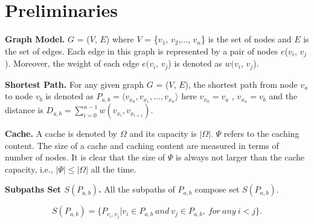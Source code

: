 \section{Preliminaries}
\label{sec:pre}
\begin{definition}
\label{def:Graph model}
{\textbf{Graph Model.}}  $G$ = ($V$, $E$) where $V$ = \{$v_1$, $v_2$,..., $v_n$\} is the set of nodes and $E$ is the set of edges. Each edge in this graph is represented by a pair of nodes $e$($v_i$, $v_j$). Moreover, the weight of each edge $e(v_i$, $v_j$) is denoted as $w(v_i$, $v_j$).
\end{definition}

\begin{definition}
\label{def:Queries and Answers}
{\textbf{Shortest Path.}} For any given graph $G$ = ($V$, $E$), the shortest path from node $v_a$ to node $v_b$ is denoted as $P_{a,b}=\langle v_{x_0},v_{x_1},...,v_{x_n}\rangle$ here $v_{x_0}=v_a$ , $v_{x_n}=v_b$ and the distance is $D_{a,b}=\sum_{i=0}^{n-1}w(v_{x_i},v_{x_{i+1}})$.
\end{definition}


\begin{definition}
\label{def:Cache}
{\textbf{Cache.}} A cache is denoted by $\Omega$ and its capacity is $|\Omega|$. $\Psi$ refers to the caching content. The size of a cache and caching content are measured in terms of number of nodes. It is clear that the size of $\Psi$ is always not larger than the cache capacity, i.e., $|\Psi|\leq |\Omega|$ all the time.
\end{definition}

\begin{definition}
\label{def:Subpaths set S(Pa,b)}
{\textbf{Subpaths Set $S(P_{a,b})$.}} All the subpaths of $P_{a,b}$ compose set $S(P_{a,b})$.
\end{definition}

\begin{equation}
\label{eq:subpaths}
S(P_{a,b})=\{P_{v_i,v_j}|v_i \in P_{a,b}~and~v_j \in P_{a,b},~for~any~i<j\} .
\end{equation}


